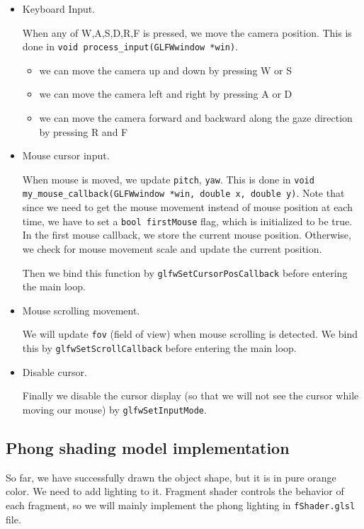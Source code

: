 \documentclass[acmtog]{acmart}
\begin{document}
\begin{itemize}
	\item Keyboard Input.
 
	When any of W,A,S,D,R,F is pressed, we move the camera position. This is done in \texttt{void process\_input(GLFWwindow *win)}. 

	\begin{itemize}
		\item we can move the camera up and down by pressing W or S
		\item we can move the camera left and right by pressing A or D
		\item we can move the camera forward and backward along the gaze direction by pressing R and F
	\end{itemize}

	\item Mouse cursor input.
 
	When mouse is moved, we update \texttt{pitch}, \texttt{yaw}. This is done in \texttt{void my\_mouse\_callback(GLFWwindow *win, double x, double y)}. Note that since we need to get the mouse movement instead of mouse position at each time, we have to set a \texttt{bool firstMouse} flag, which is initialized to be true. In the first mouse callback, we store the current mouse position. Otherwise, we check for mouse movement scale and update the current position.

	Then we bind this function by \texttt{glfwSetCursorPosCallback} before entering the main loop.


	\item Mouse scrolling movement.
 
	We will update \texttt{fov} (field of view) when mouse scrolling is detected. We bind this by \texttt{glfwSetScrollCallback} before entering the main loop.

	\item Disable cursor.
 
	Finally we disable the cursor display (so that we will not see the cursor while moving our mouse) by \texttt{glfwSetInputMode}.
 

\end{itemize}


\subsection{Phong shading model implementation}

So far, we have successfully drawn the object shape, but it is in pure orange color. We need to add lighting to it. Fragment shader controls the behavior of each fragment, so we will mainly implement the phong lighting in \texttt{fShader.glsl} file.
\end{document}
